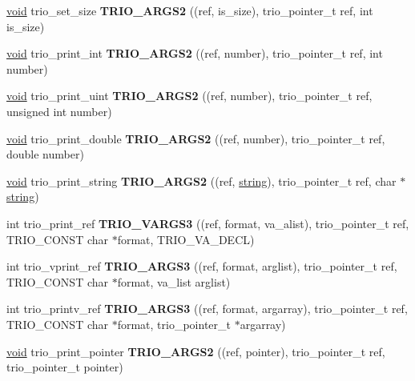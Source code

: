 \begin{DoxyCompactItemize}
\hyperlink{interfacevoid}{void} trio\+\_\+set\+\_\+size {\bfseries T\+R\+I\+O\+\_\+\+A\+R\+G\+S2} ((ref, is\+\_\+size), trio\+\_\+pointer\+\_\+t ref, int is\+\_\+size)
\item 
\mbox{\label{group___user_defined_ga5a1c88d317a3f14fe226327f671a1739}} 
\hyperlink{interfacevoid}{void} trio\+\_\+print\+\_\+int {\bfseries T\+R\+I\+O\+\_\+\+A\+R\+G\+S2} ((ref, number), trio\+\_\+pointer\+\_\+t ref, int number)
\item 
\mbox{\label{group___user_defined_gaa90e3e83b145057898f751968964c8fe}} 
\hyperlink{interfacevoid}{void} trio\+\_\+print\+\_\+uint {\bfseries T\+R\+I\+O\+\_\+\+A\+R\+G\+S2} ((ref, number), trio\+\_\+pointer\+\_\+t ref, unsigned int number)
\item 
\mbox{\label{group___user_defined_ga41c18b7ed6a679bb129d787a57e128a7}} 
\hyperlink{interfacevoid}{void} trio\+\_\+print\+\_\+double {\bfseries T\+R\+I\+O\+\_\+\+A\+R\+G\+S2} ((ref, number), trio\+\_\+pointer\+\_\+t ref, double number)
\item 
\mbox{\label{group___user_defined_ga920cdcea27762a1882518b166a8c5f23}} 
\hyperlink{interfacevoid}{void} trio\+\_\+print\+\_\+string {\bfseries T\+R\+I\+O\+\_\+\+A\+R\+G\+S2} ((ref, \hyperlink{structstring}{string}), trio\+\_\+pointer\+\_\+t ref, char $\ast$\hyperlink{structstring}{string})
\item 
\mbox{\label{group___user_defined_ga627959167a08b5d017f0a73688b0c0d7}} 
int trio\+\_\+print\+\_\+ref {\bfseries T\+R\+I\+O\+\_\+\+V\+A\+R\+G\+S3} ((ref, format, va\+\_\+alist), trio\+\_\+pointer\+\_\+t ref, T\+R\+I\+O\+\_\+\+C\+O\+N\+ST char $\ast$format, T\+R\+I\+O\+\_\+\+V\+A\+\_\+\+D\+E\+CL)
\item 
\mbox{\label{group___user_defined_ga0fb352887a8bc1f9cae1547f3693a138}} 
int trio\+\_\+vprint\+\_\+ref {\bfseries T\+R\+I\+O\+\_\+\+A\+R\+G\+S3} ((ref, format, arglist), trio\+\_\+pointer\+\_\+t ref, T\+R\+I\+O\+\_\+\+C\+O\+N\+ST char $\ast$format, va\+\_\+list arglist)
\item 
\mbox{\label{group___user_defined_ga55cd52dc252e1d47ab49f867753c0ddf}} 
int trio\+\_\+printv\+\_\+ref {\bfseries T\+R\+I\+O\+\_\+\+A\+R\+G\+S3} ((ref, format, argarray), trio\+\_\+pointer\+\_\+t ref, T\+R\+I\+O\+\_\+\+C\+O\+N\+ST char $\ast$format, trio\+\_\+pointer\+\_\+t $\ast$argarray)
\item 
\mbox{\label{group___user_defined_gab17c4400a1693f4b50abf99ca6fb4d2b}} 
\hyperlink{interfacevoid}{void} trio\+\_\+print\+\_\+pointer {\bfseries T\+R\+I\+O\+\_\+\+A\+R\+G\+S2} ((ref, pointer), trio\+\_\+pointer\+\_\+t ref, trio\+\_\+pointer\+\_\+t pointer)
\end{DoxyCompactItemize}


